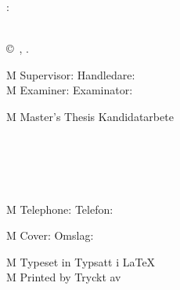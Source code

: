 \begingroup %
\newpage
\thispagestyle{empty}
\vspace*{4.5cm}
\thesisImprintTitle:\\
\thesisImprintSubtitle\\[1ex]
\thesisAuthor \setlength{\parskip}{2\baselineskip}

\copyright~\thesisAuthor, \thesisYear.

\if\thesisType M
	Supervisor:
\else
	Handledare:
\fi
\thesisSupervisor\\
\if\thesisType M
	Examiner:
\else
	Examinator:
\fi
\thesisExaminer

\if\thesisType M
	Master's Thesis
\else
	Kandidatarbete
\fi
\thesisYear\\
\thesisDepartment\\
\thesisDivision\\
\ifx\thesisGroup\undefined
\else
	\thesisGroup\\
\fi
\thesisUniversity\\
\thesisImprintLocation\\
\if\thesisType M
	Telephone:
\else
	Telefon:
\fi
\thesisUniversityTel

\vfill
\ifx\thesisCoverFigure\undefined
\else
	\if\thesisType M
		Cover:
	\else
		Omslag:
	\fi
	\thesisCoverFigureCaption
	\setlength{\parskip}{\baselineskip} \fi

\if\thesisType M
	Typeset in
\else
	Typsatt i
\fi
\LaTeX\\
\ifx\thesisPrintedBy\undefined
\else
	\if\thesisType M
		Printed by
	\else
		Tryckt av
	\fi
	\thesisPrintedBy\\
\fi
\thesisLocation\ \thesisYear
\endgroup